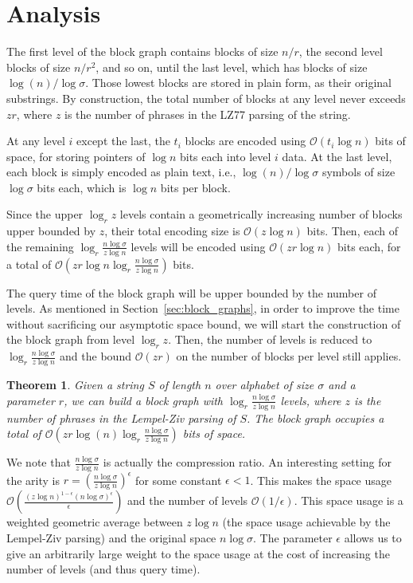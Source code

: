 \documentclass[12pt]{article}
\newcommand{\Oh}[1]
  {\ensuremath{\mathcal{O}\!\left({#1}\right)}}
\newtheorem{thrm}[obs]{Theorem}
\begin{document}
\section{Analysis}
\label{sec:analysis}

The first level of the block graph contains blocks of size
$n/r$, the second level blocks of size $n/r^2$, and so on, until
the last level, which has blocks of size $\log (n) / \log \sigma$. Those lowest
blocks are stored in plain form, as their original substrings.
By construction, the total number of blocks at any level never exceeds
$zr$, where $z$ is the number of phrases in the LZ77 parsing of the string.

At any level $i$ except the last, the $t_i$ blocks are encoded
using $\Oh{t_i\log n}$ bits of space, for storing pointers of $\log n$ bits
each into level $i$ data. At the last level, each block is simply encoded
as plain text, i.e., $\log (n) / \log \sigma$ symbols of size $\log\sigma$ bits each,
which is $\log n$ bits per block.

Since the upper $\log_r z$ levels contain a geometrically increasing number of blocks upper bounded by $z$,
their total encoding size is $\Oh{z\log n}$ bits. Then, each of the remaining
$\log_r \frac{n \log \sigma}{z \log n}$ levels will be encoded using $\Oh{zr \log n}$ bits
each, for a total of $\Oh{zr\log n\log_r \frac{n \log \sigma}{z \log n}}$ bits.

The query time of the block graph will be upper bounded by the number
of levels.  As mentioned in Section~\ref{sec:block_graphs}, in order to improve the time
without sacrificing our asymptotic space bound, we will start the construction of the block
graph from level $\log_r z$. Then, the number of levels is reduced to
$\log_r \frac{n \log \sigma}{z \log n}$ and the bound $\Oh{zr}$ on the number of blocks
per level still applies.

\begin{thrm}
Given a string $S$ of length $n$ over alphabet of size $\sigma$ and a parameter
$r$, we can build a block graph with $\log_r \frac{n \log \sigma}{z \log n}$ levels,
where $z$ is the number of phrases in the Lempel-Ziv parsing of $S$. The block
graph occupies a total of $\Oh{zr \log (n) \log_r \frac{n \log \sigma}{z \log n}}$ bits of space.
\end{thrm}

We note that $\frac{n \log \sigma}{z \log n}$ is actually the compression
ratio. An interesting setting for the arity is $r= \left(\frac{n \log \sigma}{z \log n}\right)^\epsilon$
for some constant $\epsilon<1$. This makes the space usage
$\Oh{\frac{(z\log n)^{1-\epsilon}(n\log\sigma)^\epsilon}{\epsilon}}$
and the number of levels $\Oh{1/\epsilon}$. This space usage is a weighted
geometric average between $z\log n$ (the space usage achievable by the
Lempel-Ziv parsing) and the original space $n\log\sigma$. The parameter
$\epsilon$ allows us to give an arbitrarily large weight to the space usage
at the cost of increasing the number of levels (and thus query time).
\end{document}
